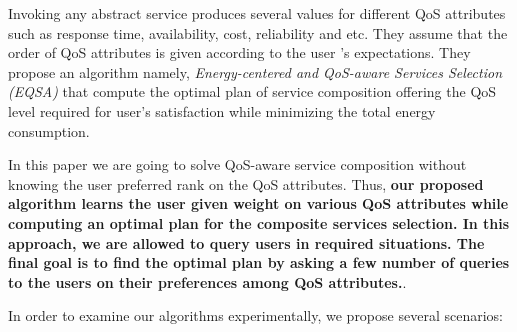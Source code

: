 \documentclass[10pt,journal,compsoc]{IEEEtran}
\begin{document}
Invoking any abstract service produces several values for different QoS attributes such as response time, availability, cost, reliability and etc. They assume that the order of QoS attributes is given according to the user 's expectations. They propose an algorithm namely, \emph{Energy-centered and QoS-aware Services Selection (EQSA)} that compute the optimal plan of service composition offering the QoS level required for user's satisfaction while minimizing the total energy consumption.

In this paper we are going to solve QoS-aware service composition without knowing the user preferred rank on the QoS attributes. Thus, \textbf{our proposed algorithm learns the user given weight on various QoS attributes while computing an optimal plan for the composite services selection. In this approach, we are allowed to query users in required situations. The final goal is to find the optimal plan by asking a few number of queries to the users on their preferences among QoS attributes.}.

{\color{blue} In order to examine our algorithms experimentally, we propose several scenarios:}
\end{document}
